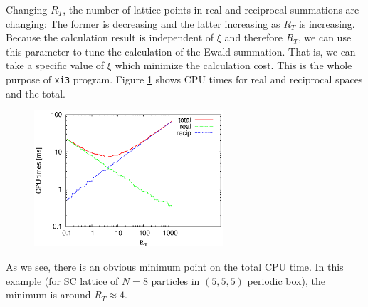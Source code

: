 \documentclass{book}
\begin{document}
Changing $R_T$, the number of lattice points in real and reciprocal
summations are changing: The former is decreasing
and the latter increasing as $R_T$ is increasing.
Because the calculation result is independent of $\xi$ and therefore $R_T$,
we can use this parameter to tune the calculation of the Ewald summation.
That is, we can take a specific value of $\xi$ which minimize
the calculation cost.
This is the whole purpose of {\tt xi3} program.
Figure \ref{fig:xi3-CPU} shows CPU times for real and reciprocal spaces
and the total.
\begin{figure}
  \centering
  \includegraphics[width=7cm]{figures/FIG-xi3-CPU}
  \caption{
  }
  \label{fig:xi3-CPU}
\end{figure}
As we see, there is an obvious minimum point on the total CPU time.
In this example (for SC lattice of $N=8$ particles in
$(5, 5, 5)$ periodic box),
the minimum is around $R_T\approx 4$.
\end{document}
